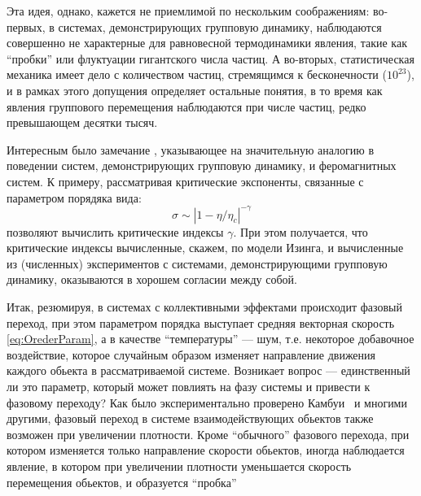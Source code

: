     Эта идея, однако, кажется не приемлимой по нескольким соображениям: во-первых, в системах, демонстрирующих групповую динамику, наблюдаются совершенно не характерные для равновесной термодинамики явления, такие как ``пробки'' или флуктуации гигантского числа частиц. А во-вторых, статистическая механика имеет дело с количеством частиц, стремящимся к бесконечности ($10^{23}$), и в рамках этого допущения определяет остальные понятия, в то время как явления группового перемещения наблюдаются при числе частиц, редко превышающем десятки тысяч.

    Интересным было замечание \cite{tu2000}, указывающее на значительную аналогию в поведении систем, демонстрирующих групповую динамику, и феромагнитных систем. К примеру, рассматривая критические экспоненты, связанные с параметром порядяка вида:
    \begin{equation}
        \sigma \sim |1-\eta/\eta_c|^{-\gamma}
    \end{equation}
    позволяют вычислить критические индексы $\gamma$. При этом получается, что критические индексы вычисленные, скажем, по модели Изинга, и вычисленные из (численных) экспериментов с системами, демонстрирующими групповую динамику, оказываются в хорошем согласии между собой.

    Итак, резюмируя, в системах с коллективными эффектами происходит фазовый переход, при этом параметром порядка выступает средняя векторная скорость \ref{eq:OrederParam}, а в качестве ``температуры'' --- шум, т.е. некоторое добавочное воздействие, которое случайным образом изменяет направление движения каждого обьекта в рассматриваемой системе. Возникает вопрос --- единственный ли это параметр, который может повлиять на фазу системы и привести к фазовому переходу? Как было экспериментально проверено Камбуи~\cite{cambui2012} и многими другими, фазовый переход в системе взаимодействующих обьектов также возможен при увеличении плотности. Кроме ``обычного'' фазового перехода, при котором изменяется только направление скорости обьектов, иногда наблюдается явление, в котором при увеличении плотности уменьшается скорость перемещения обьектов, и образуется ``пробка''\cite{keller1971}

